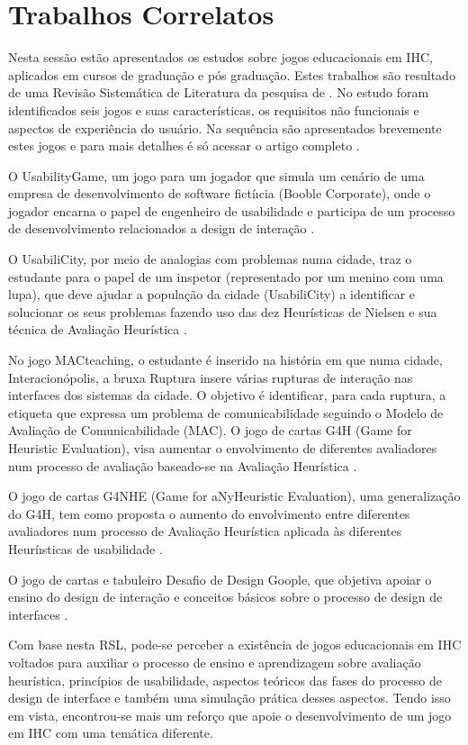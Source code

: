 \section{Trabalhos Correlatos}
\label{sec:trab_cor}

Nesta sessão estão apresentados os estudos sobre jogos educacionais em IHC, aplicados em cursos de graduação e pós graduação. Estes trabalhos são resultado de uma Revisão Sistemática de Literatura da pesquisa de . No estudo foram identificados seis jogos e suas características, os requisitos não funcionais e aspectos de experiência do usuário. Na sequência são apresentados brevemente estes jogos e para mais detalhes é só acessar o artigo completo \cite{deSales_SousaeSilva_2020}.

O UsabilityGame, um jogo para um jogador que simula um cenário de uma empresa de desenvolvimento de software fictíıcia (Booble Corporate), onde o jogador encarna o papel de engenheiro de usabilidade e participa de um processo de desenvolvimento relacionados a design de interação \cite{sommariva}.

O UsabiliCity, por meio de analogias com problemas numa cidade, traz o estudante para o papel de um inspetor (representado por um menino com uma lupa), que deve ajudar a população da cidade (UsabiliCity) a identificar e solucionar os seus problemas fazendo uso das dez Heurísticas de Nielsen e sua técnica de Avaliação Heurística \cite{ferreira2014a, ferreira2014b}.

No jogo MACteaching, o estudante é inserido na história em que numa cidade, Interacionópolis, a bruxa Ruptura insere várias rupturas de interação nas interfaces dos sistemas da cidade. O objetivo é identificar, para cada ruptura, a etiqueta que expressa um problema de comunicabilidade seguindo o Modelo de Avaliação de Comunicabilidade (MAC)\cite{brito, queiroz}.  
O jogo de cartas G4H (Game for Heuristic Evaluation), visa aumentar o envolvimento de diferentes avaliadores num processo de avaliação baseado-se na Avaliação Heurística \cite{juca2017}.

O jogo de cartas G4NHE (Game for aNyHeuristic Evaluation), uma generalização do G4H, tem como proposta o aumento do envolvimento  entre  diferentes  avaliadores  num  processo  de    Avaliação Heurística aplicada às diferentes Heuríısticas de usabilidade \cite{deSousa2019}.

O jogo de cartas e tabuleiro Desafio de Design Goople, que objetiva apoiar o ensino do design de interação e conceitos básicos sobre o processo de design de interfaces \cite{darin}.

Com base nesta RSL, pode-se perceber a existência de jogos educacionais em IHC voltados para auxiliar o processo de ensino e aprendizagem sobre avaliação heurística, princípios de usabilidade, aspectos teóricos das fases do processo de design de interface e também uma simulação prática desses aspectos. Tendo isso em vista, encontrou-se mais um reforço que apoie o desenvolvimento de um jogo em IHC com uma temática diferente.

